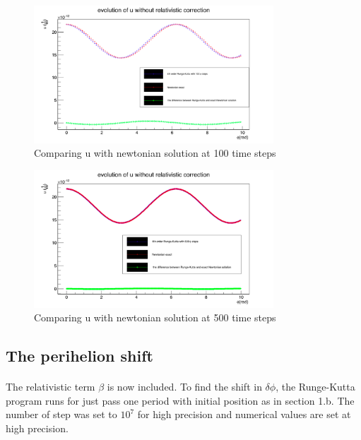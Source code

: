 \begin{figure}[!htbp]
\begin{center}
\includegraphics[width=0.8\textwidth]{1_b_n100.png}
\caption{Comparing u with newtonian solution at 100 time steps}
\label{1b100}
\end{center}
\end{figure}


\begin{figure}[!htbp]
\begin{center}
\includegraphics[width=0.8\textwidth]{1_b_n500.png}
\caption{Comparing u with newtonian solution at 500 time steps}
\label{1b500}
\end{center}
\end{figure}


\FloatBarrier
\subsection{The perihelion shift}
\paragraph{}
The relativistic term $ \beta $ is now included. To find the shift in $\delta \phi $, the Runge-Kutta program runs for just pass  one period with initial position as in section 1.b. The number of step was set to $10^{7} $ for high precision and numerical values are set at high precision.

